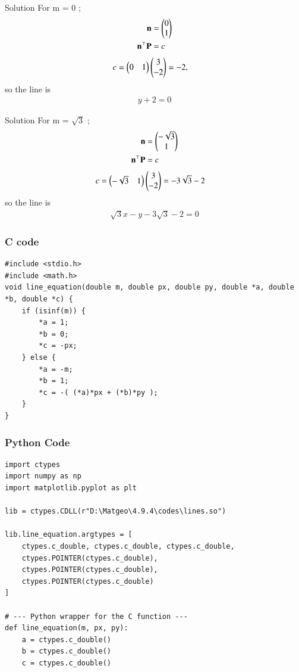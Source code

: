 \documentclass{beamer}
\begin{document}
\begin{frame}{Solution}
For m = 0 ;
\begin{align}
    \mathbf{n} &= \begin{pmatrix}0\\1\end{pmatrix}\\
    \mathbf{n}^\top \mathbf{P} &= c
\end{align}
\begin{align}
    c = \begin{pmatrix}0&1\end{pmatrix}\begin{pmatrix}3\\-2\end{pmatrix}&=-2,
\end{align}
so the line is
\begin{align}
    y+2=0
\end{align}
\end{frame}


\begin{frame}{Solution}
For m = $\sqrt{3}$ ;
\begin{align}
\mathbf{n} &= \begin{pmatrix}-\sqrt{3}\\1\end{pmatrix}\\
\mathbf{n}^\top \mathbf{P} &= c
\end{align}
\begin{align}
    c = \begin{pmatrix}-\sqrt{3}&1\end{pmatrix}\begin{pmatrix}3\\-2\end{pmatrix} &= -3\sqrt{3}-2
\end{align}
so the line is
\begin{align}
     \sqrt{3}x - y - 3\sqrt{3}-2 = 0
\end{align}
\end{frame}


\begin{frame}[fragile]
    \frametitle{C code}
    \begin{lstlisting}
#include <stdio.h>
#include <math.h>
void line_equation(double m, double px, double py, double *a, double *b, double *c) {
    if (isinf(m)) {
        *a = 1;
        *b = 0;
        *c = -px;
    } else {
        *a = -m;
        *b = 1;
        *c = -( (*a)*px + (*b)*py );
    }
}
    \end{lstlisting}
\end{frame}


\begin{frame}[fragile]
    \frametitle{Python Code}
    \begin{lstlisting}
import ctypes
import numpy as np
import matplotlib.pyplot as plt

lib = ctypes.CDLL(r"D:\Matgeo\4.9.4\codes\lines.so")

lib.line_equation.argtypes = [
    ctypes.c_double, ctypes.c_double, ctypes.c_double,
    ctypes.POINTER(ctypes.c_double),
    ctypes.POINTER(ctypes.c_double),
    ctypes.POINTER(ctypes.c_double)
]

# --- Python wrapper for the C function ---
def line_equation(m, px, py):
    a = ctypes.c_double()
    b = ctypes.c_double()
    c = ctypes.c_double()
    \end{lstlisting}
\end{frame}
\end{document}
